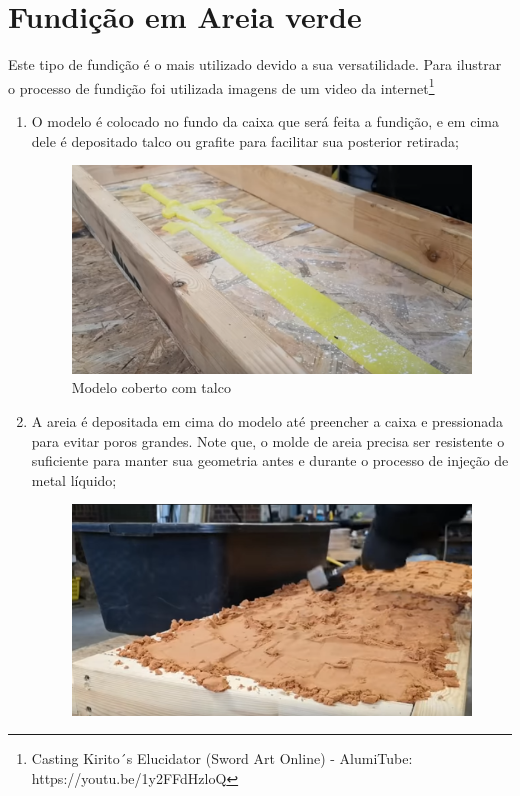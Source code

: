\documentclass[a4paper, 12pt]{article}
\begin{document}
	\section{Fundição em Areia verde}
	Este tipo de fundição é o mais utilizado devido a sua versatilidade. Para ilustrar o processo de fundição foi utilizada imagens de um video da internet\footnote{Casting Kirito´s Elucidator (Sword Art Online) - AlumiTube: https://youtu.be/1y2FFdHzloQ}
	\begin{enumerate}
		\item O modelo é colocado no fundo da caixa que será feita a fundição, e em cima dele é depositado talco ou grafite para facilitar sua posterior retirada;
		\begin{figure}[h]
			\centering
			\includegraphics[scale=0.5]{a.png}
			\caption{Modelo coberto com talco}
		\end{figure}
		\item A areia é depositada em cima do modelo até preencher a caixa e pressionada para evitar poros grandes. Note que, o molde de areia precisa ser resistente o suficiente para manter sua geometria antes e durante o processo de injeção de metal líquido;
		\begin{figure}[h]
			\centering
			\includegraphics[scale=0.5]{a1.png}

\end{figure}
\end{enumerate}
\end{document}
